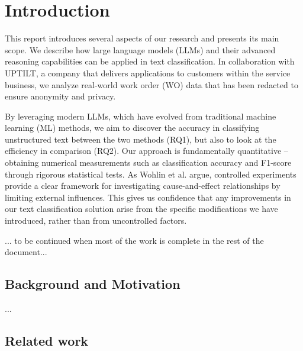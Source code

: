 \section{Introduction}

This report introduces several aspects of our research and presents its main scope. We describe how large language models (LLMs) and their advanced reasoning capabilities can be applied in text classification. In collaboration with UPTILT, a company that delivers applications to customers within the service business, we analyze real-world work order (WO) data that has been redacted to ensure anonymity and privacy.

By leveraging modern LLMs, which have evolved from traditional machine learning (ML) methods, we aim to discover the accuracy in classifying unstructured text between the two methods (RQ1), but also to look at the efficiency in comparison (RQ2). Our approach is fundamentally quantitative -- obtaining numerical measurements such as classification accuracy and F1-score through rigorous statistical tests. As Wohlin et al. \cite{wohlin2000software} argue, controlled experiments provide a clear framework for investigating cause-and-effect relationships by limiting external influences. This gives us confidence that any improvements in our text classification solution arise from the specific modifications we have introduced, rather than from uncontrolled factors.

... to be continued when most of the work is complete in the rest of the document...

\subsection{Background and Motivation}

...

\subsection{Related work}



